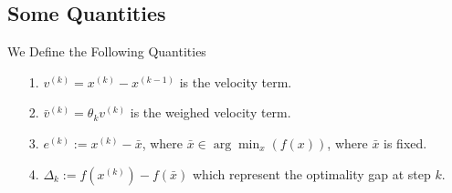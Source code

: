 \documentclass[11pt]{beamer}
\begin{document}
    \subsection{Some Quantities}
        \begin{frame}{We Define the Following Quantities}
            \begin{itemize}
                \item [1.] $v^{(k)} = x^{(k)} - x^{(k -1)}$ is the velocity term. 
                \pause\item [2.] $\bar v^{(k)}= \theta_k v^{(k)}$ is the weighed velocity term. 
                \pause\item [3.] $e^{(k)} := x^{(k)} - \bar x$, where $\bar x \in \arg\min_{x}(f(x))$, where $\bar x$ is fixed.
                \pause\item [4.] $\Delta_k := f(x^{(k)}) - f(\bar x)$ which represent the optimality gap at step $k$. 
            \end{itemize}
        \end{frame}
\end{document}
